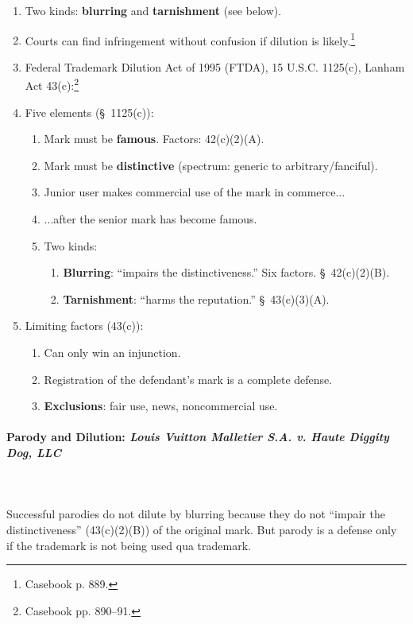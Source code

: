 \begin{enumerate}
    \item Two kinds: \textbf{blurring} and \textbf{tarnishment} (see below).
    \item Courts can find infringement without confusion if dilution is 
    likely.\footnote{Casebook p. 889.}
    \item Federal Trademark Dilution Act of 1995 (FTDA), 15 U.S.C. 1125(c), 
    Lanham Act 43(c):\footnote{Casebook pp. 890--91.}
    \item Five elements (\S\ 1125(c)):
    \begin{enumerate}
        \item Mark must be \textbf{famous}. Factors: 42(c)(2)(A).
        \item Mark must be \textbf{distinctive} (spectrum: generic to 
        arbitrary/fanciful).
        \item Junior user makes commercial use of the mark in commerce...
        \item ...after the senior mark has become famous.
        \item Two kinds:
        \begin{enumerate}
            \item \textbf{Blurring}: ``impairs the distinctiveness.'' Six 
            factors. \S\ 42(c)(2)(B).
            \item \textbf{Tarnishment}: ``harms the reputation.'' \S\ 
            43(c)(3)(A).
        \end{enumerate}
    \end{enumerate}
    \item Limiting factors (43(c)):
    \begin{enumerate}
        \item Can only win an injunction.
        \item Registration of the defendant's mark is a complete defense.
        \item \textbf{Exclusions}: fair use, news, noncommercial use. 
    \end{enumerate}
\end{enumerate}

\paragraph{Parody and Dilution: \emph{Louis Vuitton Malletier S.A. v. Haute 
Diggity Dog, LLC}}
~\\\\
Successful parodies do not dilute by blurring because they do not ``impair the 
distinctiveness'' (43(c)(2)(B)) of the original mark. But parody is a defense 
only if the trademark is not being used qua trademark.

